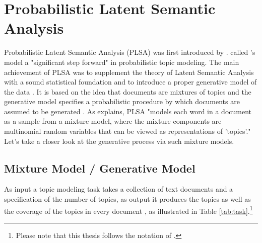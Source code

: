 \documentclass[11pt,a4paper,english,oneside]{book}
\numberwithin{equation}{chapter}
\begin{document}
\section{Probabilistic Latent Semantic Analysis}\label{PLSA}
Probabilistic Latent Semantic Analysis (PLSA) was first introduced by \cite{Hofmann.1999}. \citet[p.~994]{Blei.2003} called \citeauthor{Hofmann.1999}'s model a "significant step forward" in probabilistic topic modeling. The main achievement of PLSA was to supplement the theory of Latent Semantic Analysis with a sound statistical foundation and to introduce a proper generative model of the data \cite[p. 289]{Hofmann.1999}. It is based on the idea that documents are mixtures of topics and the generative model specifies a probabilistic procedure by which documents are assumed to be generated \cite[p.~2]{Steyvers(2007)}. As \citet[p. 994]{Blei.2003} explains, PLSA "models each word in a document as a sample from a mixture model, where the mixture components are multinomial random variables that can be viewed as representations of 'topics'." Let's take a closer look at the generative process via such mixture models.


\subsection{Mixture Model / Generative Model}\label{GM}
As input a topic modeling task takes a collection of text documents and a specification of the number of topics, as output it produces the topics as well as the coverage  of the topics in every document \cite[pp.~330--331]{Zhai.2016}, as illustrated in Table \ref{tab:task}.\footnote{Please note that this thesis follows the notation of \cite{Zhai.2016}.} 
	
\end{document}
